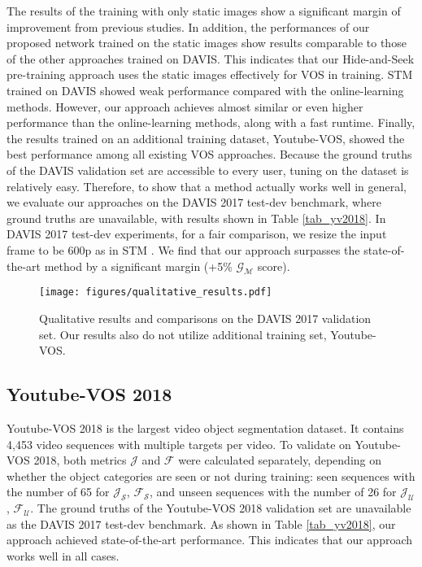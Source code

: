 \documentclass[runningheads]{llncs}
\begin{document}
The results of the training with only static images show a significant margin of improvement from previous studies. In addition, the performances of our proposed network trained on the static images show results comparable to those of the other approaches trained on DAVIS. This indicates that our Hide-and-Seek pre-training approach uses the static images effectively for VOS in training. STM \cite{Oh_2019_ICCV} trained on DAVIS showed weak performance compared with the online-learning methods. However, our approach achieves almost similar or even higher performance than the online-learning methods, along with a fast runtime. Finally, the results trained on an additional training dataset, Youtube-VOS, showed the best performance among all existing VOS approaches. Because the ground truths of the DAVIS validation set are accessible to every user, tuning on the dataset is relatively easy. Therefore, to show that a method actually works well in general, we evaluate our approaches on the DAVIS 2017 test-dev benchmark, where ground truths are unavailable, with results shown in Table \ref{tab_yv2018}. In DAVIS 2017 test-dev experiments, for a fair comparison, we resize the input frame to be 600p as in STM \cite{Oh_2019_ICCV}. We find that our approach surpasses the state-of-the-art method by a significant margin (+5\% $\mathcal{G_M}$ score).


\begin{figure}[t]
\centering
\texttt{[image: figures/qualitative\_results.pdf]}
\caption{
Qualitative results and comparisons on the DAVIS 2017 validation set. Our results also do not utilize additional training set, Youtube-VOS.
}
\label{fig:qualitative_results}
\end{figure}


\subsection{Youtube-VOS 2018}
\label{s44}
Youtube-VOS 2018 \cite{xu2018youtube} is the largest video object segmentation dataset. It contains 4,453 video sequences with multiple targets per video. To validate on Youtube-VOS 2018, both metrics $\mathcal{J}$ and $\mathcal{F}$ were calculated separately, depending on whether the object categories are seen or not during training: seen sequences with the number of 65 for $\mathcal{J_S}$, $\mathcal{F_S}$, and unseen sequences with the number of 26 for $\mathcal{J_U}$, $\mathcal{F_U}$. The ground truths of the Youtube-VOS 2018 validation set are unavailable as the DAVIS 2017 test-dev benchmark. As shown in Table \ref{tab_yv2018}, our approach achieved state-of-the-art performance. This indicates that our approach works well in all cases.
\end{document}
